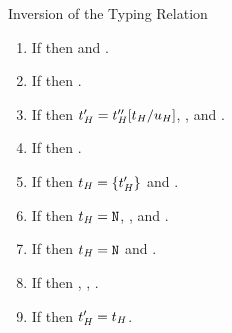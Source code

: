 \begin{lemma}{Inversion of the Typing Relation}
\begin{enumerate}

\item If \judeh{\env}{\expfapp{\first{\varexph}}{\second{\varexph}}}{\first{\vartyh}} then \judeh{\env}{\first{\varexph}}{\tyfun{\second{\vartyh}}{\first{\vartyh}}} and \judeh{\env}{\second{\varexph}}{\second{\vartyh}}.


\item If \judeh{\env}{\expfix{\varexph}}{\vartyh} then \judeh{\env}{\varexph}{\tyfun{\vartyh}{\vartyh}}.


\item If \judeh{\env}{\exptapp{\varexph}{\first{\vartyh}}}{\second{\vartyh}} then $t_{\mathit{H}}' = t_{\mathit{H}}''[t_{\mathit{H}}/u_{\mathit{H}}]$, \judth{\env}{\vartyh}, and \judeh{\env}{\varexph}{\tyfor{\tyvarh}{\third{\vartyh}}}.


\item If \judeh{\env}{\exphd{\varexph}}{\vartyh} then \judeh{\env}{\varexph}{\tylist{\vartyh}}.


\item If \judeh{\env}{\exptl{\varexph}}{\first{\vartyh}} then $t_{\mathit{H}} = \lbrace t_{\mathit{H}}' \rbrace$ and \judeh{\env}{\varexph}{\tylist{\second{\vartyh}}}.


\item If \judeh{\env}{\expop{\first{\varexph}}{\second{\varexph}}}{\first{\vartyh}} then $t_{\mathit{H}} = \mathtt{N}$, \judeh{\env}{\first{\varexph}}{\tynum}, and \judeh{\env}{\second{\varexph}}{\tynum}.


\item If \judeh{\env}{\exppnull{\varexph}}{\first{\vartyh}} then $t_{\mathit{H}} = \mathtt{N}$ and \judeh{\env}{\varexph}{\tylist{\second{\vartyh}}}.


\item If \judeh{\env}{\expif{\first{\varexph}}{\second{\varexph}}{\third{\varexph}}}{\vartyh} then \judeh{\env}{\first{\varexph}}{\tynum}, \judeh{\env}{\second{\varexph}}{\vartyh}, \judeh{\env}{\third{\varexph}}{\vartyh}.


\item If  then $t_{\mathit{H}}' = t_{\mathit{H}}$.


\end{enumerate}
\end{lemma}
